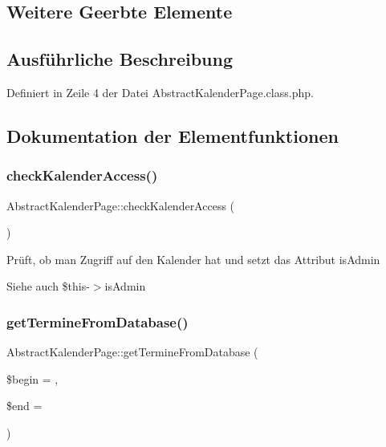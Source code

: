 \subsection*{Weitere Geerbte Elemente}


\subsection{Ausführliche Beschreibung}


Definiert in Zeile 4 der Datei Abstract\+Kalender\+Page.\+class.\+php.



\subsection{Dokumentation der Elementfunktionen}
\mbox{\label{class_abstract_kalender_page_a6e5d41527d29eddb9b2c3f846bca69d1}} 
\subsubsection{\texorpdfstring{check\+Kalender\+Access()}{checkKalenderAccess()}}
{\footnotesize\ttfamily Abstract\+Kalender\+Page\+::check\+Kalender\+Access (\begin{DoxyParamCaption}{ }\end{DoxyParamCaption})\hspace{0.3cm}{\ttfamily [abstract]}}

Prüft, ob man Zugriff auf den Kalender hat und setzt das Attribut is\+Admin \begin{DoxySeeAlso}{Siehe auch}
\$this-\/$>$is\+Admin 
\end{DoxySeeAlso}
\mbox{\label{class_abstract_kalender_page_a9ca1f9b4dd18edaef203ee9d5c20f2cd}} 
\subsubsection{\texorpdfstring{get\+Termine\+From\+Database()}{getTermineFromDatabase()}}
{\footnotesize\ttfamily Abstract\+Kalender\+Page\+::get\+Termine\+From\+Database (\begin{DoxyParamCaption}\item[{}]{\$begin = {\ttfamily \textquotesingle{}\textquotesingle{}},  }\item[{}]{\$end = {\ttfamily \textquotesingle{}\textquotesingle{}} }\end{DoxyParamCaption})\hspace{0.3cm}{\ttfamily [abstract]}}

